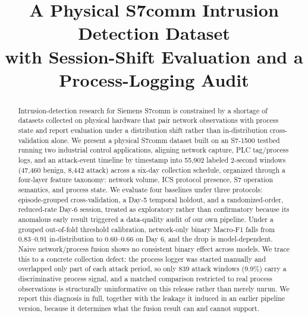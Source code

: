\documentclass[conference]{IEEEtran}
\begin{document}
\title{A Physical S7comm Intrusion Detection Dataset\\
with Session-Shift Evaluation and a Process-Logging Audit}

\author{
}

\maketitle

\begin{abstract}
Intrusion-detection research for Siemens S7comm is constrained by a shortage of datasets collected on
physical hardware that pair network observations with process state and report evaluation under a
distribution shift rather than in-distribution cross-validation alone. We present a physical S7comm
dataset built on an S7-1500 testbed running two industrial control applications, aligning network
capture, PLC tag/process logs, and an attack-event timeline by timestamp into 55{,}902 labeled 2-second
windows (47{,}460 benign, 8{,}442 attack) across a six-day collection schedule, organized through a
four-layer feature taxonomy: network volume, ICS protocol presence, S7 operation semantics, and process
state. We evaluate four baselines under three protocols: episode-grouped cross-validation, a Day-5
temporal holdout, and a randomized-order, reduced-rate Day-6 session, treated as exploratory rather than
confirmatory because its anomalous early result triggered a data-quality audit of our own pipeline. Under
a grouped out-of-fold threshold calibration, network-only binary Macro-F1 falls from 0.83--0.91
in-distribution to 0.60--0.66 on Day 6, and the drop is model-dependent. Naive network/process fusion
shows no consistent binary effect across models. We trace this to a concrete collection defect: the
process logger was started manually and overlapped only part of each attack period, so only 839 attack
windows (9.9\%) carry a discriminative process signal, and a matched comparison restricted to real
process observations is structurally uninformative on this release rather than merely unrun. We report
this diagnosis in full, together with the leakage it induced in an earlier pipeline
version, because it determines what the fusion result can and cannot support.
\end{abstract}
\end{document}
